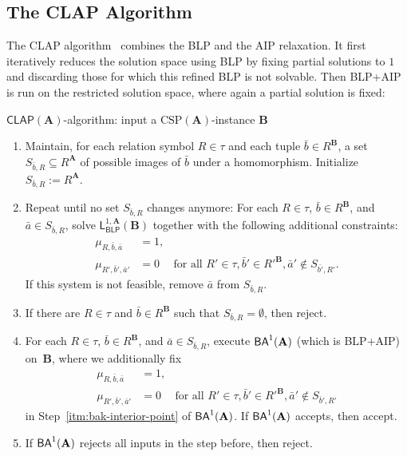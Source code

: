 \documentclass[a4paper,english, thm-restate]{lipics-v2021}
\newcommand{\tup}[1]{\bar{#1}}
\newcommand{\sig}{\tau}
\newcommand{\StructA}{\mathbf{A}}
\newcommand{\StructB}{\mathbf{B}}
\newcommand{\CSP}[1]{\mathrm{CSP}(#1)}
\newcommand{\leqs}{\mathsf{L}}
\newcommand{\blk}[3]{\leqs^{#1,#2}_{\mathsf{BLP}} (#3)}
\newcommand{\CLAP}[1]{\mathsf{CLAP}(#1)}
\begin{document}
	
	\subsection{The CLAP Algorithm}
	\label{sec:CLAP}
	The CLAP algorithm~\cite{CiardoZivny2023CLAP} combines the BLP and the AIP relaxation.
	It first iteratively reduces the solution space using BLP by fixing partial solutions to $1$ and discarding those for which this refined BLP is not solvable.
	Then BLP+AIP is run on the restricted solution space, where again a partial solution is fixed:
	
	\begin{algobox}{$\CLAP{\StructA}$-algorithm:
			input a $\CSP{\StructA}$-instance $\StructB$}
		\begin{enumerate}
			\item Maintain, for each relation symbol $R\in \sig$ and  each tuple $\tup{b} \in R^\StructB$,
			a set $S_{\tup{b},R} \subseteq R^\StructA$ of possible images of $\tup{b}$ under a homomorphism.
			Initialize $S_{\tup{b},R} := R^\StructA$. 
			\item Repeat until no set $S_{\tup{b},R}$ changes anymore:
			For each $R\in\sig$, $\tup{b} \in R^\StructB$, and $\tup{a} \in S_{\tup{b},R}$, solve $\blk{1}{\StructA}{\StructB}$ together with the following additional constraints:
			\setlength{\abovedisplayskip}{5pt}
			\setlength{\belowdisplayskip}{5pt}
			\begin{align*}
				\mu_{R,\tup{b},\tup{a}} &= 1,\\
				\mu_{R',\tup{b}',\tup{a}'} &= 0 &\text{for all } R' \in \sig, \tup{b}'\in R'^\StructB, \tup{a}' \not\in S_{\tup{b'},R'}.
			\end{align*}
			If this system is not feasible, remove $\tup{a}$ from $S_{\tup{b},R}$.
			\item If there are $R\in\sig$ and $\tup{b}\in R^\StructB$ such that $S_{\tup{b},R} =\emptyset$, then reject.
			\item For each $R \in \sig$, $\tup{b} \in R^\StructB$, and $\tup{a} \in S_{\tup{b},R}$, execute $\BAk{1}{\StructA}$ (which is BLP+AIP) on~$\StructB$, where we additionally fix
			\begin{align*}
				\mu_{R,\tup{b},\tup{a}} &= 1,\\
				\mu_{R',\tup{b}',\tup{a}'} & = 0 &\text{for all } R' \in \sig, \tup{b}' \in R'^\StructB, \tup{a}' \not\in S_{\tup{b}',R'}
			\end{align*}
			in Step~\ref{itm:bak-interior-point} of $\BAk{1}{\StructA}$.
			If $\BAk{1}{\StructA}$ accepts, then accept.\label{itm:clap-call-bak-short}
			\item If $\BAk{1}{\StructA}$ rejects all inputs in the step before, then reject.
		\end{enumerate}
	\end{algobox}
	
\end{document}
